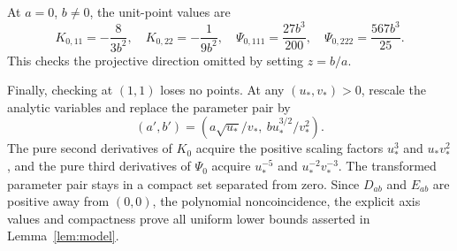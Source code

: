 \documentclass[11pt,a4paper]{article}
\numberwithin{equation}{section}
\theoremstyle{remark}
\begin{document}
At $a=0$, $b\ne0$, the unit-point values are
\begin{equation}\label{eq:a-zero}
 K_{0,11}=-\frac8{3b^2},\quad K_{0,22}=-\frac1{9b^2},\quad
 \Psi_{0,111}=\frac{27b^3}{200},\quad
 \Psi_{0,222}=\frac{567b^3}{25}.
\end{equation}
This checks the projective direction omitted by setting $z=b/a$.

Finally, checking at $(1,1)$ loses no points. At any $(u_*,v_*)>0$, rescale
the analytic variables and replace the parameter pair by
\[
 (a',b')=\left(a\sqrt{u_*}/v_*,\ b u_*^{3/2}/v_*^2\right).
\]
The pure second derivatives of $K_0$ acquire the positive scaling factors
$u_*^3$ and $u_*v_*^2$, and the pure third derivatives of $\Psi_0$ acquire
$u_*^{-5}$ and $u_*^{-2}v_*^{-3}$. The transformed parameter pair stays
in a compact set separated from zero. Since $D_{ab}$ and $E_{ab}$ are
positive away from $(0,0)$, the polynomial noncoincidence, the explicit
axis values and compactness prove all uniform lower bounds asserted in
Lemma~\ref{lem:model}.
\end{document}

